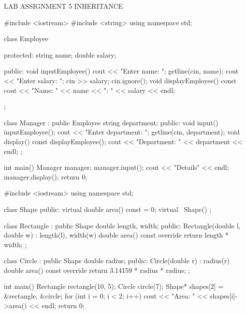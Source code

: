
\assignmenttitle
    {LAB ASSIGNMENT 5}
    {INHERITANCE}


\programs


\codelabel

\begin{code}
#include <iostream>
#include <string>
using namespace std;

class Employee {
protected:
    string name;
    double salary;

public:
    void inputEmployee() {
        cout << "Enter name: "; getline(cin, name);
        cout << "Enter salary: "; cin >> salary; cin.ignore();
    }
    void displayEmployee() const {
        cout << "Name: " << name << "\nSalary: " << salary << endl;
    }
};

class Manager : public Employee {
    string department;
public:
    void input() {
        inputEmployee();
        cout << "Enter department: "; getline(cin, department);
    }
    void display() const {
        displayEmployee();
        cout << "Department: " << department << endl;
    }
};

int main() {
    Manager manager;
    manager.input();
    cout << "\nManager Details" << endl;
    manager.display();
    return 0;
}
\end{code}

\outputlabel
{}


\codelabel

\begin{code}
#include <iostream>
using namespace std;

class Shape {
public:
    virtual double area() const = 0;
    virtual ~Shape() {}
};

class Rectangle : public Shape {
    double length, width;
public:
    Rectangle(double l, double w) : length(l), width(w) {}
    double area() const override { return length * width; }
};

class Circle : public Shape {
    double radius;
public:
    Circle(double r) : radius(r) {}
    double area() const override { return 3.14159 * radius * radius; }
};

int main() {
    Rectangle rectangle(10, 5); Circle circle(7);
    Shape* shapes[2] = {&rectangle, &circle};
    for (int i = 0; i < 2; i++) cout << "Area: " << shapes[i]->area() << endl;
    return 0;
}
\end{code}

